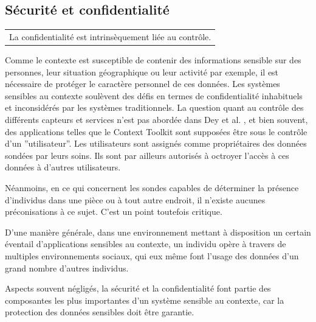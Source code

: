 \subsection{Sécurité et confidentialité}

{%
    \centering
    \begin{tabular}{l}
        La confidentialité est intrinsèquement liée au contrôle.
        \cite{ackerman_privacy_2001} \\
    \end{tabular}
}%


Comme le contexte est susceptible de contenir des informations sensible sur des
personnes, leur situation géographique ou leur activité par exemple, il est
nécessaire de protéger le caractère personnel de ces données. Les systèmes
sensibles au contexte soulèvent des défis en termes de confidentialité
inhabituels et inconsidérés par les systèmes traditionnels. La question quant au
contrôle des différents capteurs et services n'est pas abordée dans Dey et al.
\cite{dey_conceptual_2001}, et bien souvent, des applications telles que le
Context Toolkit sont supposées être sous le contrôle d'un ''utilisateur''. Les
utilisateurs sont assignés comme propriétaires des données sondées par leurs
soins. Ils sont par ailleurs autorisés à octroyer l'accès à ces données à
d'autres utilisateurs.

Néanmoins, en ce qui concernent les sondes capables de déterminer la présence
d'individus dans une pièce ou à tout autre endroit, il n'existe aucunes
préconisations à ce sujet. C'est un point toutefois critique.

D'une manière générale, dans une environnement mettant à disposition un certain
éventail d'applications sensibles au contexte, un individu opère à travers de
multiples environnements sociaux, qui eux même font l'usage des données d'un
grand nombre d'autres individus.

Aspects souvent négligés, la sécurité et la confidentialité font partie des
composantes les plus importantes d'un système sensible au contexte, car la
protection des données sensibles doit être garantie.

